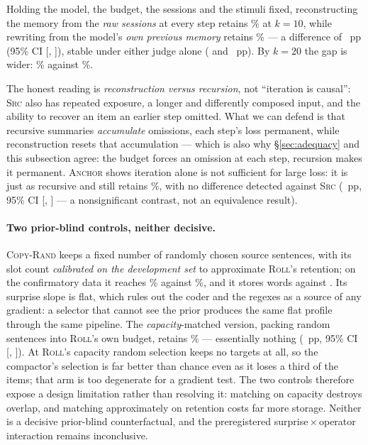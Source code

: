 Holding the model, the budget, the sessions and the stimuli fixed, reconstructing the memory from the
\emph{raw sessions} at every step retains \RetOfour{}\% at $k{=}10$, while rewriting from the
model's \emph{own previous memory} retains \RetOone{}\% --- a difference of \ContrastOfour{}~pp
(95\% CI [\ContrastOfourLo{}, \ContrastOfourHi{}]), stable under either judge alone
(\OfourJudgeOne{} and \OfourJudgeTwo{}~pp). By $k{=}20$ the gap is wider: \CurveOfourK{}\% against
\CurveOoneK{}\%.

The honest reading is \emph{reconstruction versus recursion}, not ``iteration is causal'':
\textsc{Src} also has repeated exposure, a longer and differently composed input, and the ability to
recover an item an earlier step omitted. What we can defend is that recursive summaries
\emph{accumulate} omissions, each step's loss permanent, while reconstruction resets that accumulation
--- which is also why \S\ref{sec:adequacy} and this subsection agree: the budget forces an omission
at each step, recursion makes it permanent. \textsc{Anchor} shows iteration alone is not sufficient for large loss: it is
just as recursive and still retains \RetOfive{}\%, with no difference detected against \textsc{Src}
(\PairFourVsFive{}~pp, 95\% CI [\PairFourVsFiveLo{}, \PairFourVsFiveHi{}] --- a nonsignificant
contrast, not an equivalence result).

\paragraph{Two prior-blind controls, neither decisive.} \textsc{Copy-Rand} keeps a fixed number of
randomly chosen source sentences, with its slot count \emph{calibrated on the development set} to
approximate \textsc{Roll}'s retention; on the confirmatory data it reaches \RetOthree{}\% against
\RetOone{}\%, and it stores \WordsOthree{} words against \WordsOone{}. Its surprise slope is flat, which rules out the coder
and the regexes as a source of any gradient: a selector that cannot see the prior produces the same
flat profile through the same pipeline. The \emph{capacity}-matched version, packing random sentences
into \textsc{Roll}'s own budget, retains \RetOthreeW{}\% --- essentially nothing
(\PairThreeWVsOne{}~pp, 95\% CI [\PairThreeWVsOneLo{}, \PairThreeWVsOneHi{}]). At \textsc{Roll}'s
capacity random selection keeps no targets at all, so the compactor's selection is far better than
chance even as it loses a third of the items; that arm is too degenerate for a gradient test. The two
controls therefore expose a design limitation rather than resolving it: matching on capacity destroys
overlap, and matching approximately on retention costs far more storage. Neither is a decisive
prior-blind counterfactual, and the preregistered surprise\,$\times$\,operator interaction remains
inconclusive.

